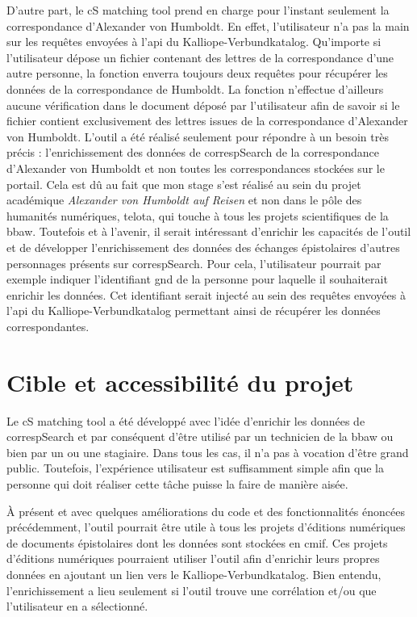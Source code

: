 \documentclass[a4paper, 12pt, twoside]{book}
\begin{document}
D'autre part, le cS matching tool prend en charge pour l'instant seulement la correspondance d'Alexander von Humboldt. En effet, l'utilisateur n'a pas la main sur les requêtes envoyées à l'\gls{api} du Kalliope-Verbundkatalog. Qu'importe si l'utilisateur dépose un fichier contenant des lettres de la correspondance d'une autre personne, la fonction enverra toujours deux requêtes pour récupérer les données de la correspondance de Humboldt. La fonction n'effectue d'ailleurs aucune vérification dans le document déposé par l'utilisateur afin de savoir si le fichier contient exclusivement des lettres issues de la correspondance d'Alexander von Humboldt. L'outil a été réalisé seulement pour répondre à un besoin très précis : l'enrichissement des données de correspSearch de la correspondance d'Alexander von Humboldt et non toutes les correspondances stockées sur le portail. Cela est dû au fait que mon stage s'est réalisé au sein du projet académique \textit{Alexander von Humboldt auf Reisen} et non dans le pôle des humanités numériques, \gls{telota}, qui touche à tous les projets scientifiques de la \gls{bbaw}. Toutefois et à l'avenir, il serait intéressant d'enrichir les capacités de l'outil et de développer l'enrichissement des données des échanges épistolaires d'autres personnages présents sur correspSearch. Pour cela, l'utilisateur pourrait par exemple indiquer l'identifiant \gls{gnd} de la personne pour laquelle il souhaiterait enrichir les données. Cet identifiant serait injecté au sein des requêtes envoyées à l'\gls{api} du Kalliope-Verbundkatalog permettant ainsi de récupérer les données correspondantes. 


\section{Cible et accessibilité du projet}
Le cS matching tool a été développé avec l'idée d'enrichir les données de correspSearch et par conséquent d'être utilisé par un technicien de la \gls{bbaw} ou bien par un ou une stagiaire. Dans tous les cas, il n'a pas à vocation d'être grand public. Toutefois, l'expérience utilisateur est suffisamment simple afin que la personne qui doit réaliser cette tâche puisse la faire de manière aisée. 

À présent et avec quelques améliorations du code et des fonctionnalités énoncées précédemment, l'outil pourrait être utile à tous les projets d'éditions numériques de documents épistolaires dont les données sont stockées en \gls{cmif}. Ces projets d'éditions numériques pourraient utiliser l'outil afin d'enrichir leurs propres données en ajoutant un lien vers le Kalliope-Verbundkatalog. Bien entendu, l'enrichissement a lieu seulement si l'outil trouve une corrélation et/ou que l'utilisateur en a sélectionné. 
\end{document}
